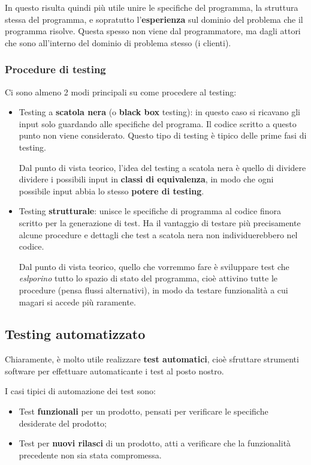 \documentclass[a4paper,11pt]{article}
\begin{document}
In questo risulta quindi più utile unire le specifiche del programma, la struttura stessa del programma, e sopratutto l'\textbf{esperienza} sul dominio del problema che il programma risolve. Questa spesso non viene dal programmatore, ma dagli attori che sono all'interno del dominio di problema stesso (i clienti).

\subsubsection{Procedure di testing}
Ci sono almeno 2 modi principali su come procedere al testing:
\begin{itemize}
	\item Testing a \textbf{scatola nera} (o \textbf{black box} testing): in questo caso si ricavano gli input solo guardando alle specifiche del programa. Il codice scritto a questo punto non viene considerato. Questo tipo di testing è tipico delle prime fasi di testing.

		Dal punto di vista teorico, l'idea del testing a scatola nera è quello di dividere dividere i possibili input in \textbf{classi di equivalenza}, in modo che ogni possibile input abbia lo stesso \textbf{potere di testing}.

	\item Testing \textbf{strutturale}: unisce le specifiche di programma al codice finora scritto per la generazione di test. Ha il vantaggio di testare più precisamente alcune procedure e dettagli che test a scatola nera non individuerebbero nel codice.

		Dal punto di vista teorico, quello che vorremmo fare è sviluppare test che \textit{eslporino} tutto lo spazio di stato del programma, cioè attivino tutte le procedure (pensa flussi alternativi), in modo da testare funzionalità a cui magari si accede più raramente.

\end{itemize}

\subsection{Testing automatizzato}
Chiaramente, è molto utile realizzare \textbf{test automatici}, cioè sfruttare strumenti software per effettuare automaticante i test al posto nostro.

I casi tipici di automazione dei test sono:
\begin{itemize}
	\item Test \textbf{funzionali} per un prodotto, pensati per verificare le specifiche desiderate del prodotto;
	\item Test per \textbf{nuovi rilasci} di un prodotto, atti a verificare che la funzionalità precedente non sia stata compromessa.
\end{itemize}
\end{document}

